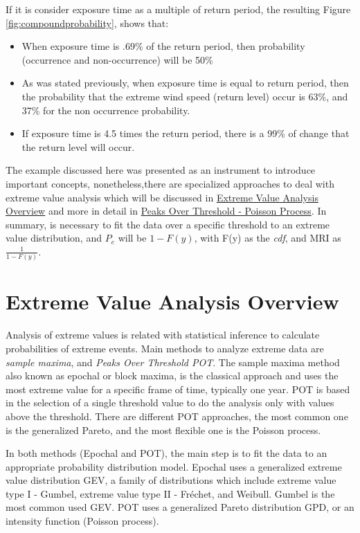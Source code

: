 \documentclass[12pt,oneside]{reedthesis}
\providecommand{\tightlist}{%
  \setlength{\itemsep}{0pt}\setlength{\parskip}{0pt}}
\begin{document}
If it is consider exposure time as a multiple of return period, the resulting Figure \ref{fig:compoundprobability}, shows that:
\begin{itemize}
\tightlist
\item
  When exposure time is .69\% of the return period, then probability (occurrence and non-occurrence) will be 50\%
\item
  As was stated previously, when exposure time is equal to return period, then the probability that the extreme wind speed (return level) occur is 63\%, and 37\% for the non occurrence probability.
\item
  If exposure time is 4.5 times the return period, there is a 99\% of change that the return level will occur.
\end{itemize}
The example discussed here was presented as an instrument to introduce important concepts, nonetheless,there are specialized approaches to deal with extreme value analysis which will be discussed in \protect\hyperlink{extremeoverview}{Extreme Value Analysis Overview} and more in detail in \protect\hyperlink{pot-pp}{Peaks Over Threshold - Poisson Process}. In summary, is necessary to fit the data over a specific threshold to an extreme value distribution, and \(P_e\) will be \(1-F(y)\), with F(y) as the \emph{cdf}, and MRI as \(\frac{1}{1-F(y)}\).

\hypertarget{extremeoverview}{%
\section{Extreme Value Analysis Overview}\label{extremeoverview}}

Analysis of extreme values is related with statistical inference to calculate probabilities of extreme events. Main methods to analyze extreme data are \emph{sample maxima}, and \emph{Peaks Over Threshold POT}. The sample maxima method also known as epochal or block maxima, is the classical approach and uses the most extreme value for a specific frame of time, typically one year. POT is based in the selection of a single threshold value to do the analysis only with values above the threshold. There are different POT approaches, the most common one is the generalized Pareto, and the most flexible one is the Poisson process.

In both methods (Epochal and POT), the main step is to fit the data to an appropriate probability distribution model. Epochal uses a generalized extreme value distribution GEV, a family of distributions which include extreme value type I - Gumbel, extreme value type II - Fréchet, and Weibull. Gumbel is the most common used GEV. POT uses a generalized Pareto distribution GPD, or an intensity function (Poisson process).
\end{document}
